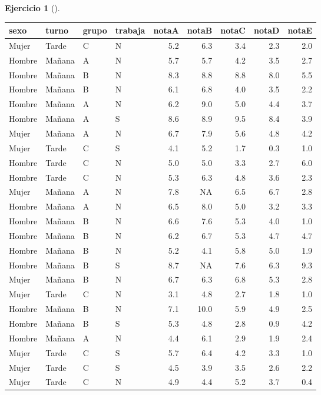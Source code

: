 \documentclass[
  a4paper,
]{scrreport}
\theoremstyle{definition}
\newtheorem{exercise}{Ejercicio}[chapter]
\theoremstyle{remark}
\begin{document}
\begin{exercise}[]
\begin{enumerate}
\begin{tcolorbox}
  \begin{longtable}[]{@{}llllrrrrr@{}}
  \toprule\noalign{}
  sexo & turno & grupo & trabaja & notaA & notaB & notaC & notaD &
  notaE \\
  \midrule\noalign{}
  \endhead
  \bottomrule\noalign{}
  \endlastfoot
  Mujer & Tarde & C & N & 5.2 & 6.3 & 3.4 & 2.3 & 2.0 \\
  Hombre & Mañana & A & N & 5.7 & 5.7 & 4.2 & 3.5 & 2.7 \\
  Hombre & Mañana & B & N & 8.3 & 8.8 & 8.8 & 8.0 & 5.5 \\
  Hombre & Mañana & B & N & 6.1 & 6.8 & 4.0 & 3.5 & 2.2 \\
  Hombre & Mañana & A & N & 6.2 & 9.0 & 5.0 & 4.4 & 3.7 \\
  Hombre & Mañana & A & S & 8.6 & 8.9 & 9.5 & 8.4 & 3.9 \\
  Mujer & Mañana & A & N & 6.7 & 7.9 & 5.6 & 4.8 & 4.2 \\
  Mujer & Tarde & C & S & 4.1 & 5.2 & 1.7 & 0.3 & 1.0 \\
  Hombre & Tarde & C & N & 5.0 & 5.0 & 3.3 & 2.7 & 6.0 \\
  Hombre & Tarde & C & N & 5.3 & 6.3 & 4.8 & 3.6 & 2.3 \\
  Mujer & Mañana & A & N & 7.8 & NA & 6.5 & 6.7 & 2.8 \\
  Hombre & Mañana & A & N & 6.5 & 8.0 & 5.0 & 3.2 & 3.3 \\
  Hombre & Mañana & B & N & 6.6 & 7.6 & 5.3 & 4.0 & 1.0 \\
  Hombre & Mañana & B & N & 6.2 & 6.7 & 5.3 & 4.7 & 4.7 \\
  Hombre & Mañana & B & N & 5.2 & 4.1 & 5.8 & 5.0 & 1.9 \\
  Hombre & Mañana & B & S & 8.7 & NA & 7.6 & 6.3 & 9.3 \\
  Mujer & Mañana & B & N & 6.7 & 6.3 & 6.8 & 5.3 & 2.8 \\
  Mujer & Tarde & C & N & 3.1 & 4.8 & 2.7 & 1.8 & 1.0 \\
  Hombre & Mañana & B & N & 7.1 & 10.0 & 5.9 & 4.9 & 2.5 \\
  Hombre & Mañana & B & S & 5.3 & 4.8 & 2.8 & 0.9 & 4.2 \\
  Hombre & Mañana & A & N & 4.4 & 6.1 & 2.9 & 1.9 & 2.4 \\
  Mujer & Tarde & C & S & 5.7 & 6.4 & 4.2 & 3.3 & 1.0 \\
  Mujer & Tarde & C & S & 4.5 & 3.9 & 3.5 & 2.6 & 2.2 \\
  Mujer & Tarde & C & N & 4.9 & 4.4 & 5.2 & 3.7 & 0.4 \\

\end{longtable}
\end{tcolorbox}
\end{enumerate}
\end{exercise}
\end{document}
